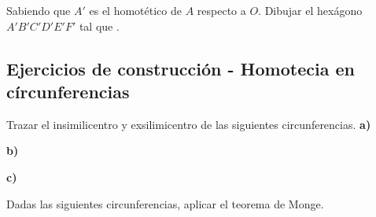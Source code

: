 \newpage
\begin{section-exercise}
    Sabiendo que $A'$ es el homotético de $A$ respecto a $O$.
    Dibujar el hexágono $A' B' C' D' E' F'$ tal que .
    \vspace*{\fill}
    \begin{figure}[H]
        \centering
        
    \end{figure}
    \vspace*{\fill}
\end{section-exercise}






\newpage
\subsection{Ejercicios de construcción - Homotecia en círcunferencias}

\begin{section-exercise}
    Trazar el insimilicentro y exsilimicentro de las siguientes circunferencias.
    \textbf{a)}
    \vspace*{\fill}
    \begin{figure}[H]
        \centering
        
    \end{figure}
    \vspace*{\fill}
    \newpage
    \textbf{b)}
    \vspace*{\fill}
    \begin{figure}[H]
        \centering
        
    \end{figure}
    \vspace*{\fill}
    \newpage
    \textbf{c)}
    \vspace*{\fill}
    \begin{figure}[H]
        \centering
        
    \end{figure}
    \vspace*{\fill}
\end{section-exercise}

\newpage
\begin{section-exercise}
    Dadas las siguientes circunferencias, aplicar el teorema de Monge.
    \vspace*{\fill}
    \begin{figure}[H]
        \centering
        
    \end{figure}
    \vspace*{\fill}
\end{section-exercise}

